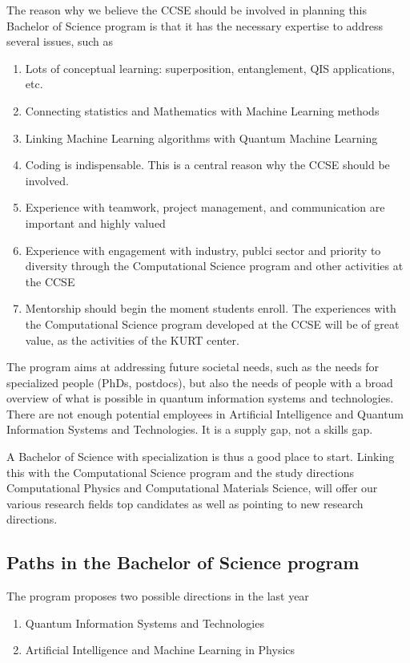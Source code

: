 \documentclass[aps,rmp,preprint,amsmath,amssymb,graphicx,longbibliography]{revtex4-1}
\begin{document}
The reason why we believe the CCSE should be involved in planning this Bachelor of Science program is that it has the necessary expertise to address several issues, such as
\begin{enumerate}
    \item  Lots of conceptual learning: superposition, entanglement, QIS applications, etc. 
    \item Connecting statistics and Mathematics with Machine Learning methods
    \item Linking Machine Learning algorithms with Quantum Machine Learning
\item Coding is indispensable. This is a central reason why the CCSE should be involved.
\item Experience with teamwork, project management, and communication are important and highly valued
\item  Experience with engagement with industry, publci sector and priority to diversity through the Computational Science program and other activities at the CCSE
\item  Mentorship should begin the moment students enroll. The experiences with the Computational Science program developed at the CCSE will be of great value, as the activities of the KURT center.
\end{enumerate}

The program aims at addressing future societal needs, such as the  needs for specialized people (PhDs, postdocs), but also the needs of  people with a broad overview of what is possible in  quantum information systems and technologies. There are  not enough potential employees in Artificial Intelligence and Quantum Information Systems and Technologies. It is a supply gap, not a skills gap.

A Bachelor of Science  with specialization  is thus a good place to start. Linking this with the Computational Science program and the study directions Computational Physics and Computational Materials Science, will offer our various research fields top candidates as well as pointing to new research directions. 

\subsection{Paths in the Bachelor of Science program}

The program proposes two possible directions in the last year
\begin{enumerate}
    \item Quantum Information Systems and Technologies
    \item Artificial Intelligence and Machine Learning in Physics
\end{enumerate}
\end{document}
